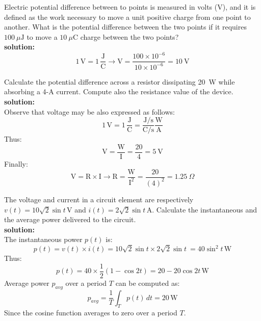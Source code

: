 \begin{exercise}
Electric potential difference between to points is measured in volts (V), and it is defined as the work necessary to move a unit positive charge from one point to another. What is the potential difference between the two points if it requires $100~\mu\textrm{J}$ to move a $10~\mu\textrm{C}$ charge between the two points?\\

\textbf{solution:}\\
\[1\,\textrm{V} = 1\,\frac{\textrm{J}}{\textrm{C}} \longrightarrow \textrm{V} = \frac{100 \times 10^{-6}}{10 \times 10^{-6}} = 10~\textrm{V} \] 
\end{exercise}

\begin{exercise}
Calculate the potential difference across a resistor dissipating 20~W while absorbing a 4-A current. Compute also the resistance value of the device.\\

\textbf{solution:}\\
Observe that voltage may be also expressed as follows:
\[1\,\textrm{V} = 1\,\frac{\textrm{J}}{\textrm{C}} =
\frac{\textrm{J/s}}{\textrm{C/s}} \frac{\textrm{W}}{\textrm{A}}\] 
Thus:
\[\textrm{V}=\frac{\textrm{W}}{\textrm{I}}= \frac{20}{4}= 5~\textrm{V}\]
Finally:
\[\textrm{V} = \textrm{R}\times\textrm{I} \longrightarrow \textrm{R} = \frac{\textrm{W}}{\textrm{I}^2} = \frac{20}{(4)^2} = 1.25~\Omega\]
\end{exercise}

\begin{exercise}
The voltage and current in a circuit element are respectively $v(t)=10\sqrt{2}\sin t\,\textrm{V}$ and $i(t)=2\sqrt{2} \sin t\,\textrm{A}$. Calculate the instantaneous and the average power delivered to the circuit.\\

\textbf{solution:}\\
The instantaneous power $p(t)$ is:
\[p(t) = v(t)\times i(t) = 10\sqrt{2}\sin t \times 2\sqrt{2} \sin t\ = 40\sin^2 t\,\textrm{W}\]
Thus:
\[p(t) = 40 \times\frac{1}{2}(1-\cos 2t) = 20 -20\cos 2t\,\textrm{W}\]
Average power $p_{avg}$ over a period $T$ can be computed as:
\[p_{avg} = \frac{1}{T}\int_Tp(t)\,dt = 20\,\textrm{W}\]
Since the cosine function averages to zero over a period $T$.
\end{exercise}

